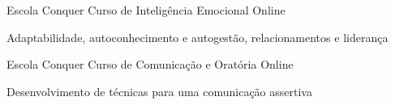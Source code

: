 

\begin{cventries}

  \cventry
    {Escola Conquer} %
    {Curso de Inteligência Emocional} %
    {Online} %
    {} %
    {
      \begin{cvitems} %
        \item {Adaptabilidade, autoconhecimento e autogestão, relacionamentos e liderança}
      \end{cvitems}
    }

    
      \cventry
    {Escola Conquer} %
    {Curso de Comunicação e Oratória} %
    {Online} %
    {} %
    {
      \begin{cvitems} %
        \item {Desenvolvimento de técnicas para uma comunicação assertiva}
      \end{cvitems}
    }

\end{cventries}
